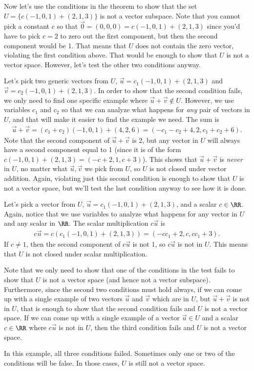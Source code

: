 \begin{example} Now let's use the conditions in the theorem to show
  that the set $U=\{c(-1,0,1)+(2,1,3)\}$ is not a vector subspace.
  Note that you cannot pick a constant $c$ so that $\vec
  0=(0,0,0)=c(-1,0,1)+(2,1,3)$ since you'd have to pick $c=2$ to zero
  out the first component, but then the second component would be 1.
  That means that $U$ does not contain the zero vector, violating the first condition above.  That would be enough to show that $U$ is not a vector space.
  However, let's test the other two conditions anyway. 

  Let's pick two generic vectors from $U$, $\vec u=c_1(-1,0,1)+(2,1,3)$ and $\vec v=c_2(-1,0,1)+(2,1,3)$.  In order to show that the second condition fails, we only need to find one specific example where $\vec u+\vec v \notin U$.  However, we use variables $c_1$ and $c_2$ so that we can analyze what happens for \emph{any} pair of vectors in $U$, and that will make it easier to find the example we need.  The sum is
  \begin{align*}
    \vec u+\vec v=(c_1+c_2)(-1,0,1)+(4,2,6)
    =(-c_1-c_2+4, 2, c_1+c_2+6).
    \end{align*}
    Note that the second component of $\vec u+\vec v$ is 2, but any vector in $U$ will always have a second component equal to 1 (since it is of the form $c(-1,0,1)+(2,1,3)=(-c+2, 1, c+3)$).  This shows that $\vec u+\vec v$ is \emph{never} in $U$, no matter what $\vec u,\vec v$ we pick from $U$, so $U$ is not closed under vector addition.  Again, violating just this second condition is enough to show that $U$ is not a vector space, but we'll test the last condition anyway to see how it is done.

    Let's pick a vector from $U$, $\vec u=c_1(-1,0,1)+(2,1,3)$, and a scalar $c\in\RR$.  Again, notice that we use variables to analyze what happens for any vector in $U$ and any scalar in $\RR$.  The scalar multiplication $c\vec u$ is
    \begin{align*}
      c\vec u = c(c_1(-1,0,1)+(2,1,3)) = (-cc_1+2, c, cc_1+3).
    \end{align*}
    If $c\neq 1$, then the second component of $c\vec u$ is not 1, so $c\vec u$ is not in $U$.  This means that $U$ is not closed under scalar multiplication.

    Note that we only need to show that one of the conditions in the test fails to show that $U$ is not a vector space (and hence not a vector subspace).  Furthermore, since the second two conditions must hold always, if we can come up with a single example of two vectors $\vec u$ and $\vec v$ which are in $U$, but $\vec u+\vec v$ is not in $U$, that is enough to show that the second condition fails and $U$ is not a vector space.  If we can come up with a single example of a vector $\vec u\in U$ and a scalar $c\in\RR$ where $c\vec u$ is not in $U$, then the third condition fails and $U$ is not a vector space.

In this example, all three conditions failed.  Sometimes only one or two of the conditions will be false.  In those cases, $U$ is still not a vector space.
\end{example}


